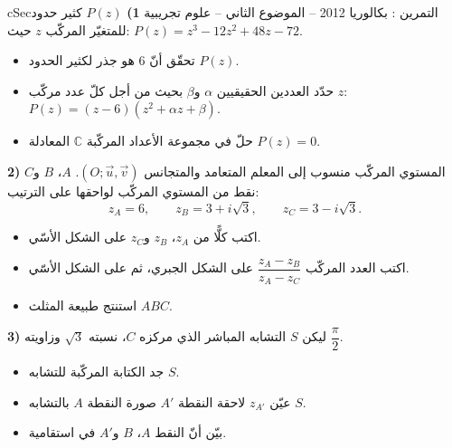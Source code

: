\documentclass[12pt,a4paper]{article}
\newenvironment{BOX}[2]{\begin{otherlanguage}{english}\begin{arbox}{#1}{#2}}{\end{arbox}\end{otherlanguage}}
\newcounter{exo}
\newenvironment{tamrin}[1]{\stepcounter{exo}\begin{BOX}{cSec}{التمرين \theexo: #1}}{\end{BOX}}
\newenvironment{sq}{\begin{itemize}[leftmargin=2.4em,itemsep=3pt]}{\end{itemize}}
\newcommand{\qa}{\item[(أ)]}\newcommand{\qb}{\item[(ب)]}\newcommand{\qc}{\item[(جـ)]}\newcommand{\qd}{\item[(د)]}\newcommand{\qe}{\item[(هـ)]}
\begin{document}
\begin{tamrin}{بكالوريا 2012 -- الموضوع الثاني -- علوم تجريبية}
\textbf{1)} $P(z)$ كثير حدود للمتغيّر المركّب $z$ حيث: $P(z)=z^3-12z^2+48z-72$.
\begin{sq}
\qa تحقّق أنّ $6$ هو جذر لكثير الحدود $P(z)$.
\qb حدّد العددين الحقيقيين $\alpha$ و$\beta$ بحيث من أجل كلّ عدد مركّب $z$: $P(z)=(z-6)(z^2+\alpha z+\beta)$.
\qc حلّ في مجموعة الأعداد المركّبة $\mathbb{C}$ المعادلة $P(z)=0$.
\end{sq}
\textbf{2)} المستوي المركّب منسوب إلى المعلم المتعامد والمتجانس $(O;\vec u,\vec v)$. $A$، $B$ و$C$ نقط من المستوي المركّب لواحقها على الترتيب:
\[z_A=6,\qquad z_B=3+i\sqrt3,\qquad z_C=3-i\sqrt3 .\]
\begin{sq}
\qa اكتب كلًّا من $z_A$، $z_B$ و$z_C$ على الشكل الأسّي.
\qb اكتب العدد المركّب $\dfrac{z_A-z_B}{z_A-z_C}$ على الشكل الجبري، ثم على الشكل الأسّي.
\qc استنتج طبيعة المثلث $ABC$.
\end{sq}
\textbf{3)} ليكن $S$ التشابه المباشر الذي مركزه $C$، نسبته $\sqrt3$ وزاويته $\dfrac{\pi}{2}$.
\begin{sq}
\qa جد الكتابة المركّبة للتشابه $S$.
\qb عيّن $z_{A'}$ لاحقة النقطة $A'$ صورة النقطة $A$ بالتشابه $S$.
\qc بيّن أنّ النقط $A$، $B$ و$A'$ في استقامية.
\end{sq}
\end{tamrin}
\end{document}

